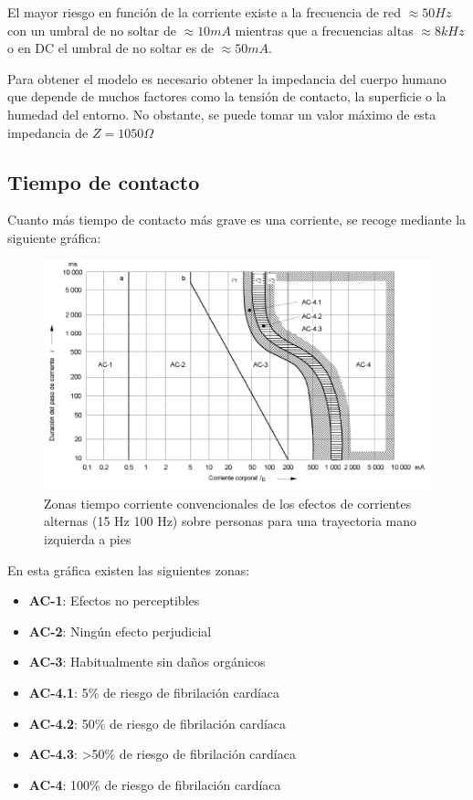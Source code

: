 El mayor riesgo en función de la corriente existe a la frecuencia de red $\approx 50 Hz$ con un umbral de no soltar de $\approx 10 mA$ mientras que a frecuencias altas $\approx 8 kHz$ o en DC el umbral de no soltar es de $\approx 50 mA$.
\newline

Para obtener el modelo es necesario obtener la impedancia del cuerpo humano que depende de muchos factores como la tensión de contacto, la superficie o la humedad del entorno. No obstante, se puede tomar un valor máximo de esta impedancia de $Z=1050\Omega$ 
\newpage
\subsection{Tiempo de contacto}
Cuanto más tiempo de contacto más grave es una corriente, se recoge mediante la siguiente gráfica:
\begin{figure}[H]
	\centering
	\includegraphics[width=0.7\linewidth]{Images/23}
	\caption{Zonas tiempo
		corriente convencionales de los efectos de corrientes alternas (15
		Hz 100 Hz) sobre personas para una trayectoria mano izquierda a pies}
	\label{fig:23}
\end{figure}

En esta gráfica existen las siguientes zonas:
\begin{itemize}
	\item \textbf{AC-1}: Efectos no perceptibles
	\item \textbf{AC-2}: Ningún efecto perjudicial
	\item \textbf{AC-3}: Habitualmente sin daños orgánicos
	\item \textbf{AC-4.1}: 5\% de riesgo de fibrilación cardíaca
	\item \textbf{AC-4.2}: 50\% de riesgo de fibrilación cardíaca
	\item \textbf{AC-4.3}: >50\% de riesgo de fibrilación cardíaca
	\item \textbf{AC-4}: 100\% de riesgo de fibrilación cardíaca
\end{itemize}

